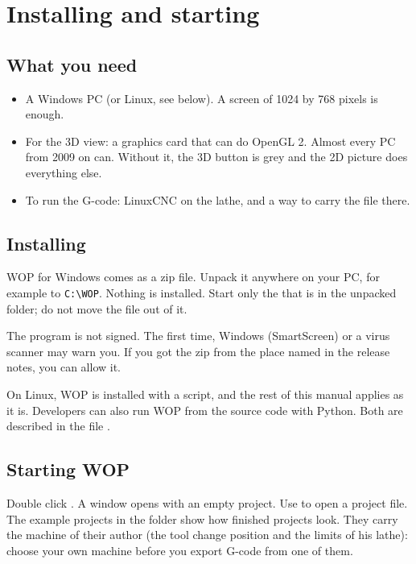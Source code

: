 \chapter{Installing and starting}\label{ch:installing}

\section{What you need}
\begin{itemize}
  \item A Windows PC (or Linux, see below). A screen of 1024 by 768 pixels is enough.
  \item For the 3D view: a graphics card that can do OpenGL 2. Almost every PC from 2009 on can. Without it, the 3D button is grey and the 2D picture does everything else.
  \item To run the G-code: LinuxCNC on the lathe, and a way to carry the file there.
\end{itemize}

\section{Installing}
WOP for Windows comes as a zip file. Unpack it anywhere on your PC, for example to \texttt{C:\textbackslash WOP}. Nothing is installed. Start only the  that is in the unpacked folder; do not move the file out of it.

The program is not signed. The first time, Windows (SmartScreen) or a virus scanner may warn you. If you got the zip from the place named in the release notes, you can allow it.

\begin{notebox}
On Linux, WOP is installed with a script, and the rest of this manual applies as it is. Developers can also run WOP from the source code with Python. Both are described in the file .
\end{notebox}

\section{Starting WOP}
Double click . A window opens with an empty project. Use  to open a project file. The example projects in the folder  show how finished projects look. They carry the machine of their author (the tool change position and the limits of his lathe): choose your own machine before you export G-code from one of them.

